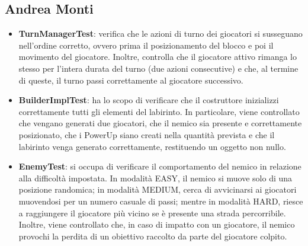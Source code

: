 \documentclass[a4paper,12pt]{report}
\begin{document}
\newpage
\subsection{Andrea Monti}
\begin{itemize}
	\item \textbf{TurnManagerTest}: verifica che le azioni di turno dei giocatori si susseguano nell’ordine corretto, 
	ovvero prima il posizionamento del blocco e poi il movimento del giocatore. 
	Inoltre, controlla che il giocatore attivo rimanga lo stesso per l’intera durata del turno (due azioni consecutive) e 
	che, al termine di queste, il turno passi correttamente al giocatore successivo.
	\item \textbf{BuilderImplTest}: ha lo scopo di verificare che il costruttore inizializzi correttamente 
	tutti gli elementi del labirinto. In particolare, viene controllato che vengano generati due giocatori, che il nemico 
	sia presente e correttamente posizionato, che i PowerUp siano creati nella quantità prevista e che il labirinto venga 
	generato correttamente, restituendo un oggetto non nullo.
	\item \textbf{EnemyTest}: si occupa di verificare il comportamento del nemico in relazione alla difficoltà impostata. In modalità
	EASY, il nemico si muove solo di una posizione randomica; in modalità MEDIUM, cerca di avvicinarsi ai 
	giocatori muovendosi per un numero casuale di passi; mentre in modalità HARD, riesce a raggiungere il giocatore più vicino se è 
	presente una strada percorribile. Inoltre, viene controllato che, in caso di impatto con un giocatore, il nemico provochi 
	la perdita di un obiettivo raccolto da parte del giocatore colpito.
\end{itemize}

\newpage
\end{document}
